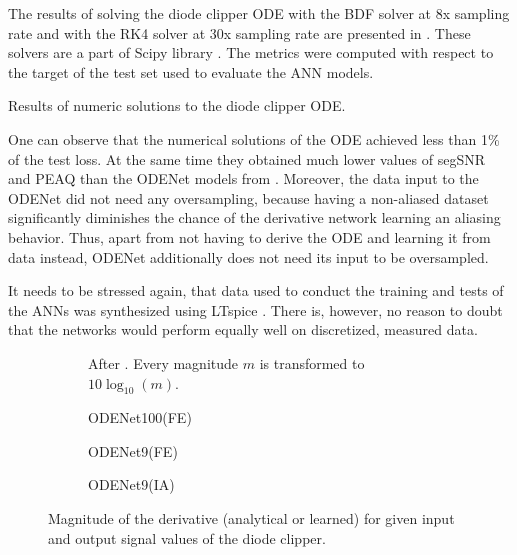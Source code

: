 The results of solving the diode clipper \ac{ODE} with the \ac{BDF} solver at 8x sampling rate and with the \ac{RK}4 solver at 30x sampling rate are presented in . These solvers are a part of Scipy library \cite{SciPy}. The metrics were computed with respect to the target of the test set used to evaluate the \ac{ANN} models.

\begin{table}[]
    \centering
    
    \caption{Results of numeric solutions to the diode clipper \ac{ODE}.}
    \label{tab:diode_clipper_ode_solvers}
\end{table}

One can observe that the numerical solutions of the \ac{ODE} achieved less than 1\% of the test loss. At the same time they obtained much lower values of \ac{segSNR} and \ac{PEAQ} than the ODENet models from . Moreover, the data input to the ODENet did not need any oversampling, because having a non-aliased dataset significantly diminishes the chance of the derivative network learning an aliasing behavior. Thus, apart from not having to derive the \ac{ODE} and learning it from data instead, ODENet additionally does not need its input to be oversampled.

It needs to be stressed again, that data used to conduct the training and tests of the \acp{ANN} was synthesized using LTspice \cite{LTspice}. There is, however, no reason to doubt that the networks would perform equally well on discretized, measured data.

\newcommand{\subfigureWidth}{0.4\textwidth}
\newcommand{\subfigureScale}{0.8}

\begin{figure}
    \centering
    \begin{subfigure}{0.9\textwidth}
        \centering
        \scalebox{\subfigureScale}{}
        \caption{After . Every magnitude $m$ is transformed to $10 \log_{10}(m)$.}
    \end{subfigure}
    \begin{subfigure}{0.9\textwidth}
        \centering
        \scalebox{\subfigureScale}{}
        \caption{ODENet100(FE)}
    \end{subfigure}
    \begin{subfigure}{\subfigureWidth}
        \scalebox{0.75}{}
        \caption{ODENet9(FE)}
    \end{subfigure}
    \begin{subfigure}{\subfigureWidth}
        \scalebox{0.76}{}
        \caption{ODENet9(IA)}
    \end{subfigure}
    \caption{Magnitude of the derivative (analytical or learned) for given input and output signal values of the diode clipper.}
    \label{fig:diode_clipper_derivative_visualizations}
\end{figure}

